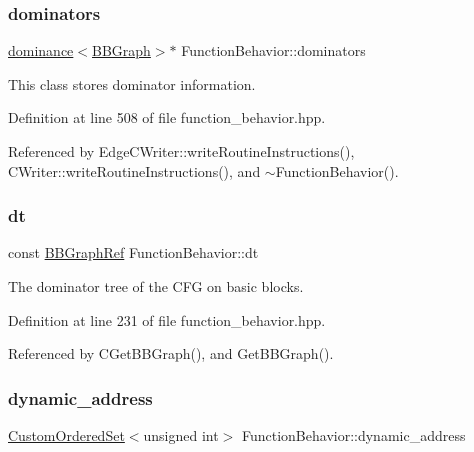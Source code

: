 \subsubsection{\texorpdfstring{dominators}{dominators}}
{\footnotesize\ttfamily \hyperlink{classdominance}{dominance}$<$\hyperlink{structBBGraph}{B\+B\+Graph}$>$$\ast$ Function\+Behavior\+::dominators}



This class stores dominator information. 



Definition at line 508 of file function\+\_\+behavior.\+hpp.



Referenced by Edge\+C\+Writer\+::write\+Routine\+Instructions(), C\+Writer\+::write\+Routine\+Instructions(), and $\sim$\+Function\+Behavior().

\mbox{\label{classFunctionBehavior_a9dafaa93a5ba25374a0362329347b43a}} 
\subsubsection{\texorpdfstring{dt}{dt}}
{\footnotesize\ttfamily const \hyperlink{basic__block_8hpp_a0e7f233d1b83cad0bfd5aa865f0d3532}{B\+B\+Graph\+Ref} Function\+Behavior\+::dt\hspace{0.3cm}{\ttfamily [private]}}



The dominator tree of the C\+FG on basic blocks. 



Definition at line 231 of file function\+\_\+behavior.\+hpp.



Referenced by C\+Get\+B\+B\+Graph(), and Get\+B\+B\+Graph().

\mbox{\label{classFunctionBehavior_a3511b0b4433aab2a2ac7997bbcfc81eb}} 
\subsubsection{\texorpdfstring{dynamic\+\_\+address}{dynamic\_address}}
{\footnotesize\ttfamily \hyperlink{classCustomOrderedSet}{Custom\+Ordered\+Set}$<$unsigned int$>$ Function\+Behavior\+::dynamic\+\_\+address\hspace{0.3cm}{\ttfamily [private]}}



